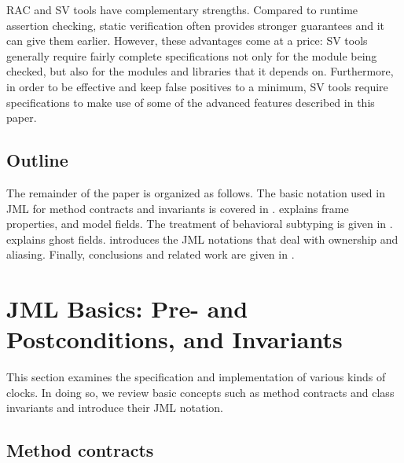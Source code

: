\documentclass{llncs}
\begin{document}
RAC and SV tools have complementary strengths.
Compared to runtime assertion checking, static verification often provides
stronger guarantees and it can give them earlier.
However, these advantages come at a price:
%
SV tools generally require fairly complete specifications not only for the
module being checked, but also for the modules and libraries that it depends
on. Furthermore, in order to be effective and keep false positives to a
minimum, SV tools require specifications to make use of some of the advanced
features described in this paper.

\subsection{Outline}

The remainder of the paper is organized as follows.
The basic notation used in JML for method contracts
and invariants is covered in .
 explains frame properties, and  model fields.
The treatment of behavioral subtyping is given in .
 explains ghost fields.
 introduces the JML notations that deal with
ownership and aliasing.  
Finally, conclusions and related work are given in .

\section{JML Basics: Pre- and Postconditions, and Invariants}
\label{Sec:basics}

%
%
This section examines the specification and implementation of
various kinds of clocks.  In doing so, we review basic concepts such as
method contracts and class invariants and introduce their JML notation.

\subsection{Method contracts}
\end{document}
